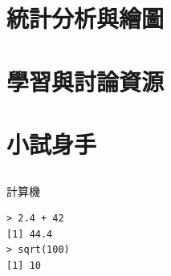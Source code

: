 \documentclass[12pt]{beamer}
\begin{document}
\section{統計分析與繪圖}\subsection{}

\section{學習與討論資源}\subsection{}

\section{小試身手}\subsection{}

\begin{frame}[fragile]{計算機}
\begin{verbatim}
> 2.4 + 42
[1] 44.4
> sqrt(100)
[1] 10
\end{verbatim}
\end{frame}
\end{document}
